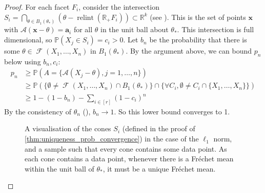 \documentclass[10pt,a4paper]{amsart}
\newcommand{\A}{\mathcal{A}}
\DeclareMathOperator{\FMset}{\mathcal{F}}
\newcommand{\R}{\mathbb{R}}
\newcommand{\mb}[1]{\mathbb #1}
\DeclareMathOperator{\relint}{relint}
\renewcommand{\vec}[1]{\mathbf{#1}}
\begin{document}
\begin{proof}
		For each facet $F_i$, consider the intersection $S_i = \bigcap_{\theta \in B_1(\theta_*)} (\theta - \relint (\R_+ F_i)) \subset \R^k$ (see ). This is the set of points $\vec x$ with $\A(\vec x - \theta) = \vec a_i$ for all $\theta$ in the unit ball about $\theta_*$. This intersection is full dimensional, so $\mb P (X_j \in S_i) = c_i > 0$. Let $b_n$ be the probability that there is some $\theta \in \FMset (X_1, \dots, X_n)$ in $B_1(\theta_*)$. By the argument above, we can bound $p_n$ below using $b_n, c_i$:
		\begin{align*}
			p_n &\geq \mb P(A = \{ \A(X_j - \theta), j=1,\dots,n \}) \\
			&\geq \mb P(\{\emptyset \neq \FMset(X_1,\dots,X_n) \cap B_1(\theta_*)\} \cap \{ \forall C_i, \emptyset \neq C_i \cap \{ X_1, \dots, X_n \} \}) \\
			&\geq 1 - (1-b_n) - \textstyle \sum_{i \in [r]} (1-c_i)^n
		\end{align*}
		By the consistency of $\theta_n$ (), $b_n \rightarrow 1$. So this lower bound converges to 1.
		\begin{figure}[ht!]
			\centering
			\caption{A visualisation of the cones $S_i$ (defined in the proof of \cref{thm:uniqueness_prob_convergence}) in the case of the $\ell_1$ norm, and a sample such that every cone contains some data point. As each cone contains a data point, whenever there is a Fr\'echet mean within the unit ball of $\theta_*$, it must be a unique Fr\'echet mean.}
			\label{fig:unique_prob_to_1}
		\end{figure}
	\end{proof}
\end{document}
